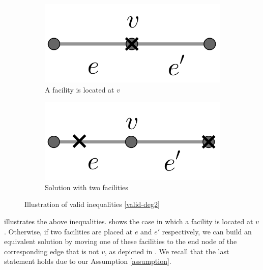 \begin{figure}
	\begin{subfigure}{0.5\textwidth}
    	\centering
    	\includegraphics[scale=1.1]{Chaptercflg/media/ineq-deg2-1.png}
    	\caption{A facility is located at $v$}
    	\label{fig:degree2a}
	\end{subfigure}
 	\begin{subfigure}{0.5\textwidth}
    	\centering
    	\includegraphics[scale=1.1]{Chaptercflg/media/ineq-deg2-2.png}
    	\caption{Solution with two facilities}
    	\label{fig:degree2b}
	\end{subfigure}
	\caption{Illustration of valid inequalities \eqref{valid-deg2}}
	\label{fig:degree2}
\end{figure}
 illustrates the above inequalities.  shows the case in which a facility is located at $v$. Otherwise, if two facilities are placed at $e$ and $e'$ respectively, we can build an equivalent solution by moving one of these facilities to the end node of the corresponding edge that is not $v$, as depicted in . We recall that the last statement holds due to our Assumption \ref{assumption}.

